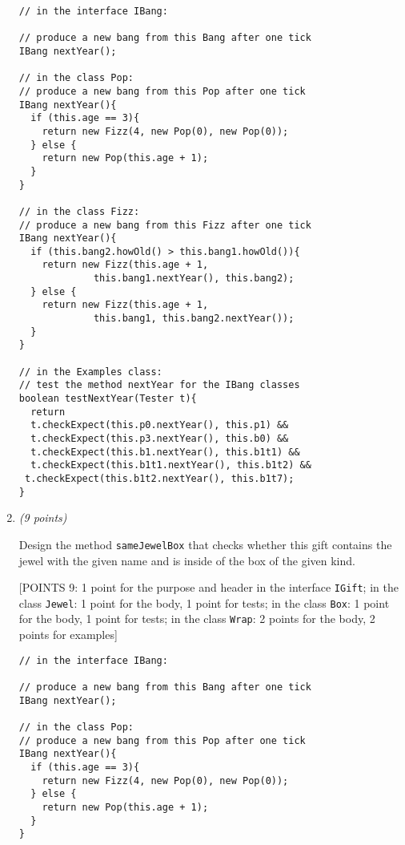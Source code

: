 \documentclass[11pt]{article}
\newcommand\code[1]{\texttt{#1}}
\newcounter{Pctr}
\newenvironment{problem}{\stepcounter{Pctr}%
\begin{description}
\item[\noindent{\bf Problem} \arabic{Pctr}] 
\end{description}}{\relax}
\begin{document}
\begin{problem}
\begin{enumerate}
\begin{verbatim}
// in the interface IBang:

// produce a new bang from this Bang after one tick
IBang nextYear();

// in the class Pop:
// produce a new bang from this Pop after one tick
IBang nextYear(){
  if (this.age == 3){
    return new Fizz(4, new Pop(0), new Pop(0));
  } else {
    return new Pop(this.age + 1);
  }
}

// in the class Fizz:
// produce a new bang from this Fizz after one tick
IBang nextYear(){
  if (this.bang2.howOld() > this.bang1.howOld()){
    return new Fizz(this.age + 1, 
             this.bang1.nextYear(), this.bang2);
  } else {
    return new Fizz(this.age + 1, 
             this.bang1, this.bang2.nextYear());
  }
}

// in the Examples class:
// test the method nextYear for the IBang classes
boolean testNextYear(Tester t){
  return
  t.checkExpect(this.p0.nextYear(), this.p1) &&
  t.checkExpect(this.p3.nextYear(), this.b0) &&
  t.checkExpect(this.b1.nextYear(), this.b1t1) &&
  t.checkExpect(this.b1t1.nextYear(), this.b1t2) &&
 t.checkExpect(this.b1t2.nextYear(), this.b1t7);
}
\end{verbatim}
\endsol

\newpage
\item {\em{(9 points)}}

Design the method \code{sameJewelBox} that checks whether this gift
contains the jewel with the given name and is inside of the box of the
given kind.


\begsol{\vspace{0.5in}}
[POINTS 9: 1 point for the purpose and header in the interface
\texttt{IGift}; in the class \texttt{Jewel}: 1 point for the body, 1
point for tests; in the class \texttt{Box}: 1 point for the body, 1
point for tests; in the class \texttt{Wrap}: 2 
points for the body, 2 points for examples]

\begin{verbatim}
// in the interface IBang:

// produce a new bang from this Bang after one tick
IBang nextYear();

// in the class Pop:
// produce a new bang from this Pop after one tick
IBang nextYear(){
  if (this.age == 3){
    return new Fizz(4, new Pop(0), new Pop(0));
  } else {
    return new Pop(this.age + 1);
  }
}


\end{verbatim}
\end{enumerate}
\end{problem}
\end{document}
